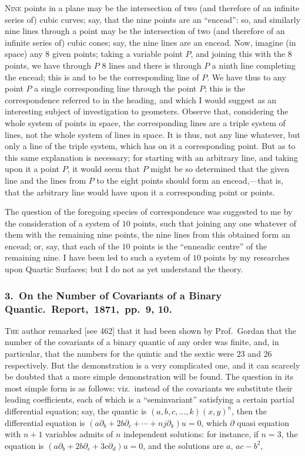 \documentclass[11pt,a4paper]{article}
\theoremstyle{plain}
\theoremstyle{definition}
\begin{document}
\textsc{Nine} points in a plane may be the intersection of two (and therefore of an
infinite series of) cubic curves; say, that the nine points are an ``encead'': so, and
similarly nine lines through a point may be the intersection of two (and therefore of
an infinite series of) cubic cones; say, the nine lines are an encead.  Now, imagine
(in space) any $8$ given points; taking a variable point $P$, and joining this with the
$8$ points, we have through $P$ $8$ lines and there is through $P$ a ninth line completing
the encead; this is and to be the corresponding line of $P$.  We have thus to any
point $P$ a single corresponding line through the point $P$; this is the correspondence
referred to in the heading, and which I would suggest as an interesting subject of
investigation to geometers.  Observe that, considering the whole system of points in
space, the corresponding lines are a triple system of lines, not the whole system of
lines in space.  It is thus, not any line whatever, but only a line of the triple system,
which has on it a corresponding point.  But as to this same explanation is necessary;
for starting with an arbitrary line, and taking upon it a point $P$, it would seem
that $P$ might be so determined that the given line and the lines from $P$ to the
eight points should form an encead,---that is, that the arbitrary line would have upon
it a corresponding point or points.

The question of the foregoing species of correspondence was suggested to me by
the consideration of a system of $10$ points, such that joining any one whatever of
them with the remaining nine points, the nine lines from this obtained form an encead; or,
say, that each of the $10$ points is the ``enneadic centre'' of the remaining nine.  I
have been led to such a system of $10$ points by my researches upon Quartic Surfaces;
but I do not as yet understand the theory.

\subsubsection*{3.\ On the Number of Covariants of a Binary Quantic.\ Report,\ 1871,\ pp.\ 9, 10.}

\textsc{The} author remarked [see 462] that it had been shown by Prof.\ Gordan that the
number of the covariants of a binary quantic of any order was finite, and, in particular,
that the numbers for the quintic and the sextic were $23$ and $26$ respectively.  But the
demonstration is a very complicated one, and it can scarcely be doubted that a more
simple demonstration will be found.  The question in its most simple form is as
follows: viz.\ instead of the covariants we substitute their leading coefficients, each of
which is a ``seminvariant'' satisfying a certain partial differential equation; say, the
quantic is $(a, b, c, \ldots, k)(x, y)^n$, then the differential equation is $(a\partial_b + 2b\partial_c + \cdots + n j\partial_k)u = 0$,
which $\partial$ quasi equation with $n + 1$ variables admits of $n$ independent solutions: for
instance, if $n = 3$, the equation is $(a\partial_b + 2b\partial_c + 3c\partial_d)u = 0$, and the solutions are $a$, $ac - b^2$,
\clearpage
\end{document}
